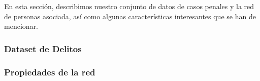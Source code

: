 
En esta sección, describimos nuestro conjunto de datos de casos penales y la red de personas asociada, así como algunas características interesantes que se han de mencionar.

\subsubsection{Dataset de Delitos}


\subsubsection{Propiedades de la red}


